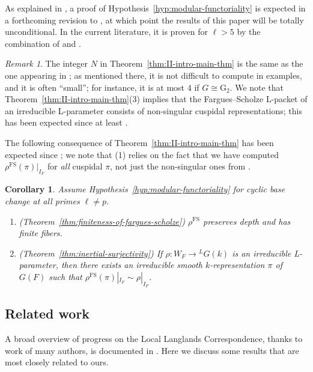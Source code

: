 \documentclass[reqno]{amsart}
\numberwithin{equation}{subsection}
\newcommand{\co}{\colon}
\newcommand{\ld}{{}^L}
\DeclareMathOperator{\FS}{FS}
\newtheorem{cor}[thm]{Corollary}
\theoremstyle{remark}
\newtheorem{remark}[thm]{Remark}
\numberwithin{equation}{subsection}
\numberwithin{figure}{subsection}
\begin{document}
As explained in \cite[\S 1.1]{CF26a}, a proof of Hypothesis~\ref{hyp:modular-functoriality} is expected in a forthcoming revision to \cite{F24}, at which point the results of this paper will be totally unconditional. In the current literature, it is proven for $\ell > 5$ by the combination of \cite{F24} and \cite{Wei26}. 

\begin{remark}The integer $N$ in Theorem~\ref{thm:II-intro-main-thm} is the same as the one appearing in \cite[Theorem~1.3.1]{CF26a}; as mentioned there, it is not difficult to compute in examples, and it is often ``small''; for instance, it is at most $4$ if $G \cong \mathrm{G}_2$. We note that Theorem~\ref{thm:II-intro-main-thm}(3) implies that the Fargues--Scholze L-packet of an irreducible L-parameter consists of non-singular cuspidal representations; this has been expected since at least \cite{Kal21b}.
\end{remark}

The following consequence of Theorem~\ref{thm:II-intro-main-thm} has been expected since \cite{FS}; we note that (1) relies on the fact that we have computed $\rho^{\FS}(\pi)|_{I_F}$ for \emph{all} cuspidal $\pi$, not just the non-singular ones from \cite{Kal21b}.

\begin{cor}\label{cor:II-intro-main-cor}
Assume Hypothesis~\ref{hyp:modular-functoriality} for cyclic base change at all primes $\ell \neq p$.

\begin{enumerate}
    \item (Theorem~\ref{thm:finiteness-of-fargues-scholze}) $\rho^{\FS}$ preserves depth and has finite fibers.
    \item (Theorem~\ref{thm:inertial-surjectivity}) If $\rho\co W_F \to \ld G(k)$ is an irreducible L-parameter, then there exists an irreducible smooth $k$-representation $\pi$ of $G(F)$ such that $\rho^{\FS}(\pi)|_{I_F} \sim \rho|_{I_F}$.
\end{enumerate}
\end{cor}

\subsection{Related work}\label{ssec:related-work}
A broad overview of progress on the Local Langlands Correspondence, thanks to work of many authors, is documented in \cite{CF26a}. Here we discuss some results that are most closely related to ours. 
\end{document}

